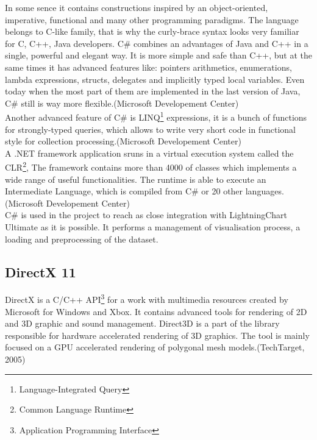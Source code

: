 \documentclass[twoside, english, 11pt]{report}
\begin{document}
In some sence it contains constructions inspired by an object-oriented, imperative, functional and many other programming paradigms. The language belongs to C-like family, that is why the curly-brace syntax looks very familiar for C, C++, Java developers. C\# combines an advantages of Java and C++ in a single, powerful and elegant way. It is more simple and safe than C++, but at the same times it has advanced features like: pointers arithmetics, enumerations, lambda expressions, structs, delegates and implicitly typed local variables. Even today when the most part of them are implemented in the last version of Java, C\# still is way more flexible.(Microsoft Developement Center)\\

Another advanced feature of C\# is  LINQ\footnote{Language-Integrated Query} expressions, it is a bunch of functions for strongly-typed queries, which allows to write very short code in functional style for collection processing.(Microsoft Developement Center)\\

A .NET framework application sruns in a virtual execution system called the CLR\footnote{Common Language Runtime}, The framework contains more than 4000 of classes which implements a wide range of useful functionalities. The runtime is able to execute an Intermediate Language, which is compiled from C\# or 20 other languages.(Microsoft Developement Center)\\

C\# is used in the project to reach as close integration with LightningChart Ultimate as it is possible. It performs a management of visualisation process, a loading and preprocessing of the dataset.

\subsection{DirectX 11}
DirectX is a C/C++ API\footnote{Application Programming Interface} for a work with multimedia resources created by Microsoft for Windows and Xbox. It contains advanced tools for rendering of 2D and 3D graphic and sound management. Direct3D is a part of the library responsible for hardware accelerated rendering of 3D graphics. The tool is mainly focused on a GPU accelerated rendering of polygonal mesh models.(TechTarget, 2005)\\
\end{document}
